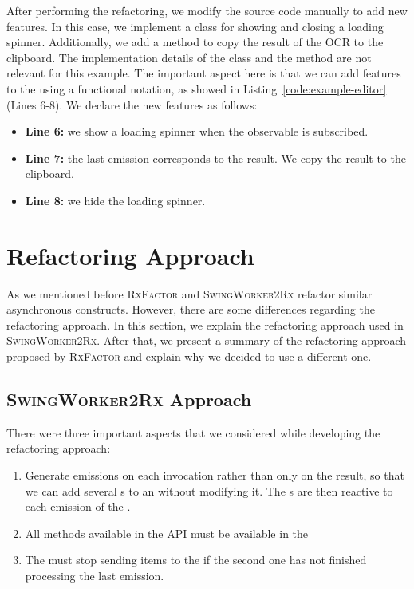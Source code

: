\documentclass[type=bsc,accentcolor=tud9c]{tudthesis}
\newcommand{\toolextension}{\textsc{SwingWorker2Rx}}
\begin{document}
After performing the refactoring, we modify the source code manually to add new features. In this case, we implement a  class for showing and closing a loading spinner. Additionally, we add a method to copy the result of the OCR to the clipboard. The implementation details of the  class and the  method are not relevant for this example. The important aspect here is that we can add features to the  using a functional notation, as showed in Listing~\ref{code:example-editor} (Lines 6-8). We declare the new features as follows:
\begin{itemize}
	\item {\bfseries Line 6:} we show a loading spinner when the observable is subscribed.
	\item {\bfseries Line 7:} the last emission corresponds to the result. We copy the result to the clipboard.
	\item {\bfseries Line 8:} we hide the loading spinner.
\end{itemize}

\section{Refactoring Approach}
As we mentioned before \textsc{RxFactor} and \toolextension{} refactor similar asynchronous constructs. However, there are some differences regarding the refactoring approach. In this section, we explain the refactoring approach used in \toolextension{}. After that, we present a summary of the refactoring approach proposed by \textsc{RxFactor} and explain why we decided to use a different one.

\subsection{\toolextension{} Approach}
\label{sec:2rx-approach}
There were three important aspects that we considered while developing the refactoring approach:
\begin{enumerate}
	\item Generate emissions on each  invocation rather than only on the result, so that we can add several s to an  without modifying it. The s are then reactive to each emission of the .
	\item All methods available in the  API must be available in the 
	\item The  must stop sending items to the  if the second one has not finished processing the last emission.
\end{enumerate}
\end{document}
